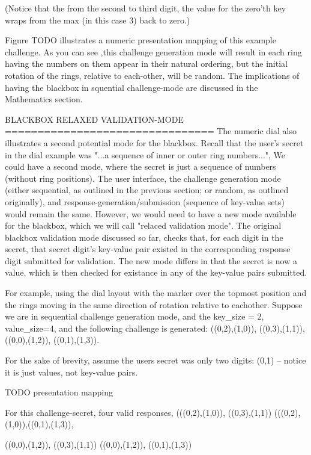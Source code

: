 \documentclass[12pt]{document}
\begin{document}
\begin{Introduction}
(Notice that the from the second to third digit, the value for the zero'th key wraps from the max (in this case 3) back to zero.)

Figure TODO illustrates a numeric presentation mapping of this example challenge. As you can see ,this challenge generation mode will result in each ring having the numbers on them appear in their natural ordering, but the initial rotation of the rings, relative to each-other, will be random. The implications of having the blackbox in squential challenge-mode are discussed in the Mathematics section.




BLACKBOX RELAXED VALIDATION-MODE
================================
The numeric dial also illustrates a second potential mode for the blackbox. Recall that the user's secret in the dial example was "...a sequence of inner or outer ring numbers...",
We could have a second mode, where the secret is just a sequence of numbers (without ring positions).  The user interface, the challenge generation mode (either sequential, as outlined in the previous section; or random, as outlined originally), and response-generation/submission (sequence of key-value sets) would remain the same. However, we would need to have a new mode available for the blackbox, which we will call "relaced validation mode".
The original blackbox validation mode discussed so far, checks that, for each digit in the secret, that secret digit's key-value pair existed in the corresponding response digit submitted for validation. The new mode differs in that the secret is now a value, which is then checked for existance in any of the key-value pairs submitted.

For example,  using the dial layout with the marker over the topmost position and the rings moving in the same direction of rotation relative to eachother.
Suppose we are in sequential challenge generation mode, and the key_size = 2, value_size=4, and the following challenge is generated:
((0,2),(1,0)), ((0,3),(1,1)), ((0,0),(1,2)), ((0,1),(1,3)).

For the sake of brevity, assume the users secret was only two digits:
(0,1)
 -- notice it is just values, not key-value pairs.

TODO presentation mapping

For this challenge-secret, four valid responses,
(((0,2),(1,0)), ((0,3),(1,1))
(((0,2),(1,0)),((0,1),(1,3)),

((0,0),(1,2)), ((0,3),(1,1))
((0,0),(1,2)), ((0,1),(1,3))


\end{Introduction}
\end{document}
